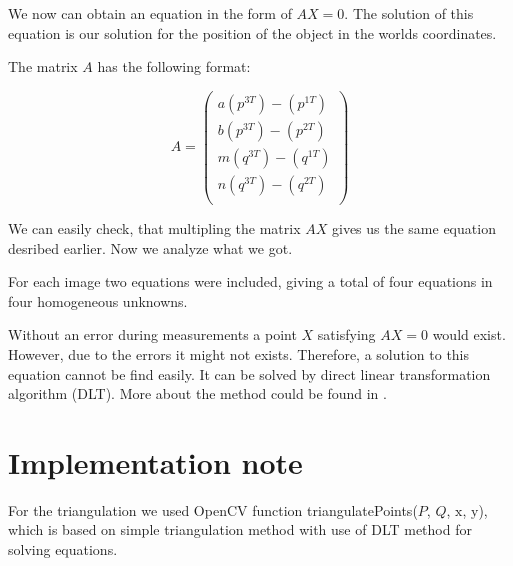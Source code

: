 We now can obtain an equation in the form of $AX = 0$. The solution of this
equation is our solution for the position of the object in the worlds
coordinates.

The matrix $A$ has the following format:

\[
A = \begin{pmatrix}
a(p^{3T}) - (p^{1T}) \\
b(p^{3T}) - (p^{2T}) \\
m(q^{3T}) - (q^{1T}) \\
n(q^{3T}) - (q^{2T}) \\
\end{pmatrix}
\]

We can easily check, that multipling the matrix $AX$ gives us the same equation
desribed earlier. Now we analyze what we got.

For each image two equations were included, giving a total of four equations in
four homogeneous unknowns.

Without an error during measurements a point $X$ satisfying $AX = 0$ would
exist. However, due to the errors it might not exists. Therefore, a solution to
this equation cannot be find easily. It can be solved by direct linear
transformation algorithm (DLT). More about the method could be found in
\citet*{multiple-view-geometry}.



\section{Implementation note}
For the triangulation we used OpenCV function triangulatePoints($P$, $Q$,
$\mathrm{x}$, $\mathrm{y}$), which is based on simple triangulation method with use of DLT
method for solving equations.
